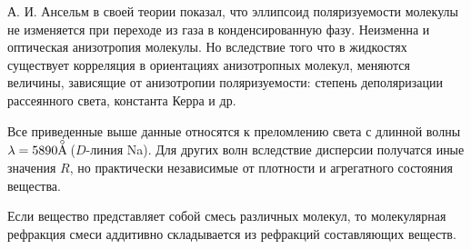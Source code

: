 А. И. Ансельм в своей теории показал, что эллипсоид поляризуемости
молекулы не изменяется при переходе из газа в конденсированную
фазу. Неизменна и оптическая анизотропия молекулы. Но вследствие
того что в жидкостях существует корреляция в ориентациях
анизотропных молекул, меняются величины, зависящие от анизотропии
поляризуемости: степень деполяризации рассеянного света, константа
Керра и др. 
\begin{figure}[tbp]

\hbox{\vbox{}} 
\end{figure}

Все приведенные выше данные относятся к преломлению света с
длинной волны $\lambda=5890\angst$ ($D$-линия Na). Для других
волн вследствие дисперсии получатся иные значения $R$, но
практически независимые от плотности и агрегатного состояния
вещества.

Если вещество представляет собой смесь различных молекул, то
молекулярная рефракция смеси аддитивно складывается из рефракций
составляющих веществ.

